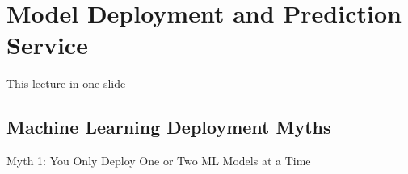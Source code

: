 
\section[Deployment]{Model Deployment and Prediction Service}


\begin{frame}{This lecture in one slide}
  \begin{withmargin}
    \begin{tdmain}
    \end{tdmain}
    \begin{tdmargin}
    \end{tdmargin}
  \end{withmargin}
\end{frame}

\subsection{Machine Learning Deployment Myths}

\begin{frame}{Myth 1: You Only Deploy One or Two ML Models at a Time}
  \begin{withmargin}
    \begin{tdmain}
    \end{tdmain}
    \begin{tdmargin}
    \end{tdmargin}
  \end{withmargin}
\end{frame}

